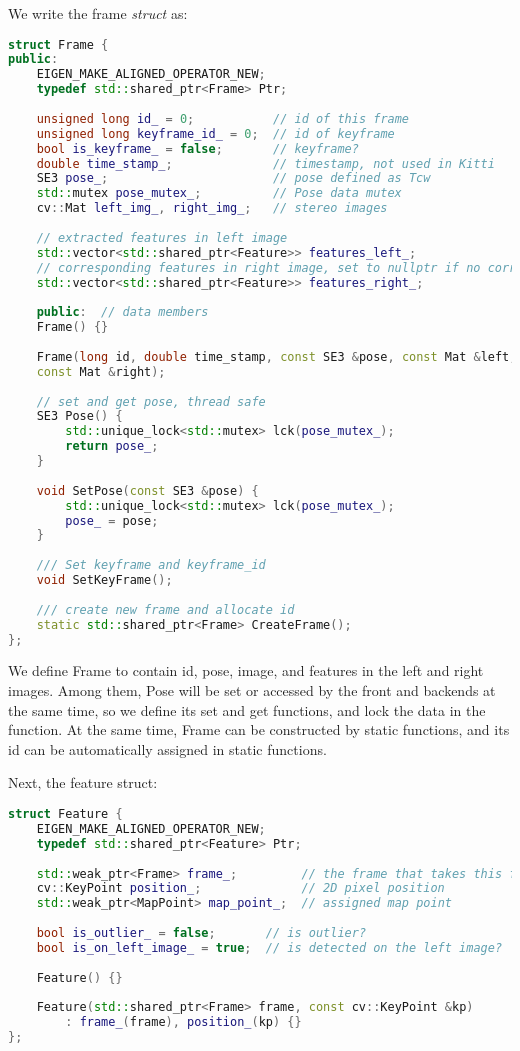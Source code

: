We write the frame \textit{struct} as:
\begin{lstlisting}[language=c++,caption=slambook2/ch13/include/myslam/frame.h]
struct Frame {
public:
	EIGEN_MAKE_ALIGNED_OPERATOR_NEW;
	typedef std::shared_ptr<Frame> Ptr;
	
	unsigned long id_ = 0;           // id of this frame
	unsigned long keyframe_id_ = 0;  // id of keyframe
	bool is_keyframe_ = false;       // keyframe?
	double time_stamp_;              // timestamp, not used in Kitti
	SE3 pose_;                       // pose defined as Tcw
	std::mutex pose_mutex_;          // Pose data mutex
	cv::Mat left_img_, right_img_;   // stereo images
	
	// extracted features in left image
	std::vector<std::shared_ptr<Feature>> features_left_;
	// corresponding features in right image, set to nullptr if no corresponding
	std::vector<std::shared_ptr<Feature>> features_right_;
	
	public:  // data members
	Frame() {}
	
	Frame(long id, double time_stamp, const SE3 &pose, const Mat &left,
	const Mat &right);
	
	// set and get pose, thread safe
	SE3 Pose() {
		std::unique_lock<std::mutex> lck(pose_mutex_);
		return pose_;
	}
	
	void SetPose(const SE3 &pose) {
		std::unique_lock<std::mutex> lck(pose_mutex_);
		pose_ = pose;
	}
	
	/// Set keyframe and keyframe_id 
	void SetKeyFrame();
	
	/// create new frame and allocate id
	static std::shared_ptr<Frame> CreateFrame();
};
\end{lstlisting}

We define Frame to contain id, pose, image, and features in the left and right images. Among them, Pose will be set or accessed by the front and backends at the same time, so we define its set and get functions, and lock the data in the function. At the same time, Frame can be constructed by static functions, and its id can be automatically assigned in static functions.

Next, the feature struct:
\begin{lstlisting}[language=c++,caption=slambook2/ch13/include/myslam/feature.h]
struct Feature {
	EIGEN_MAKE_ALIGNED_OPERATOR_NEW;
	typedef std::shared_ptr<Feature> Ptr;
	
	std::weak_ptr<Frame> frame_;         // the frame that takes this feature
	cv::KeyPoint position_;              // 2D pixel position
	std::weak_ptr<MapPoint> map_point_;  // assigned map point
	
	bool is_outlier_ = false;       // is outlier?
	bool is_on_left_image_ = true;  // is detected on the left image?
	
	Feature() {}
	
	Feature(std::shared_ptr<Frame> frame, const cv::KeyPoint &kp)
		: frame_(frame), position_(kp) {}
};
\end{lstlisting}

